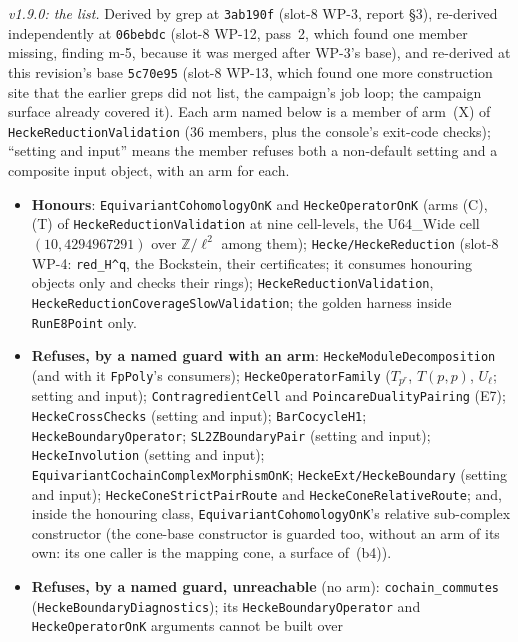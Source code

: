 \documentclass[11pt]{article}
\theoremstyle{remark}
\newcommand{\Z}{\mathbb{Z}}
\begin{document}
\begin{enumerate}[label=(b\arabic*)]
  \emph{v1.9.0: the list.} Derived by grep at \texttt{3ab190f} (slot-8 WP-3, report \S3),
  re-derived independently at \texttt{06bebdc} (slot-8 WP-12, pass~2, which found one member
  missing, finding m-5, because it was merged after WP-3's base), and re-derived at this revision's
  base \texttt{5c70e95} (slot-8 WP-13, which found one more construction site that the earlier
  greps did not list, the campaign's job loop; the campaign surface already covered it). Each arm
  named below is a member of arm~(X) of \texttt{HeckeReductionValidation} ($36$ members, plus the
  console's exit-code checks); ``setting and input'' means the member refuses both a non-default
  setting and a composite input object, with an arm for each.
  \begin{itemize}
  \item \textbf{Honours}: \texttt{EquivariantCohomologyOnK} and \texttt{HeckeOperatorOnK} (arms
    (C), (T) of \texttt{HeckeReductionValidation} at nine cell-levels, the U64\_Wide cell
    $(10,4294967291)$ over $\Z/\ell^2$ among them); \texttt{Hecke/HeckeReduction} (slot-8 WP-4:
    \texttt{red\_H\textasciicircum q}, the Bockstein, their certificates; it consumes honouring
    objects only and checks their rings); \texttt{HeckeReductionValidation},
    \texttt{HeckeReductionCoverageSlowValidation}; the golden harness inside \texttt{RunE8Point}
    only.
  \item \textbf{Refuses, by a named guard with an arm}: \texttt{HeckeModuleDecomposition} (and
    with it \texttt{FpPoly}'s consumers); \texttt{HeckeOperatorFamily} ($T_{p^r}$, $T(p,p)$,
    $U_\ell$; setting and input); \texttt{ContragredientCell} and
    \texttt{PoincareDualityPairing} (E7); \texttt{HeckeCrossChecks} (setting and input);
    \texttt{BarCocycleH1}; \texttt{HeckeBoundaryOperator}; \texttt{SL2ZBoundaryPair} (setting and
    input); \texttt{HeckeInvolution} (setting and input); \texttt{EquivariantCochainComplexMorphismOnK};
    \texttt{HeckeExt/HeckeBoundary} (setting and input); \texttt{HeckeConeStrictPairRoute} and
    \texttt{HeckeConeRelativeRoute}; and, inside the honouring class,
    \texttt{EquivariantCohomologyOnK}'s relative sub-complex constructor (the cone-base
    constructor is guarded too, without an arm of its own: its one caller is the mapping cone, a
    surface of~(b4)).
  \item \textbf{Refuses, by a named guard, unreachable} (no arm):
    \texttt{cochain\_commutes} (\texttt{HeckeBoundaryDiagnostics}); its
    \texttt{HeckeBoundaryOperator} and \texttt{HeckeOperatorOnK} arguments cannot be built over

\end{itemize}
\end{enumerate}
\end{document}
